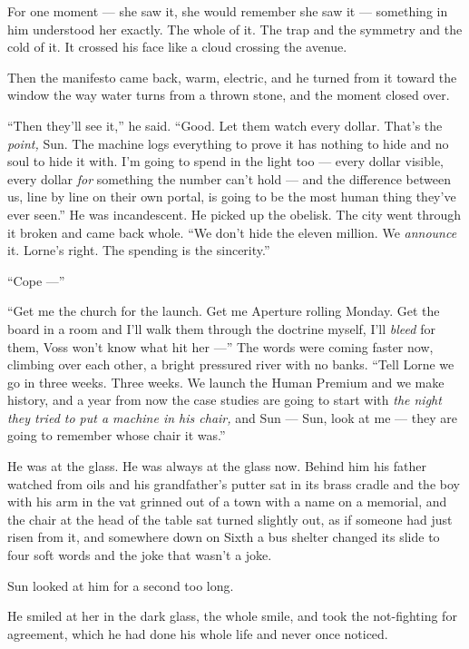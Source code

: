 \documentclass[11pt,openany]{book}
\begin{document}
For one moment --- she saw it, she would remember she saw it --- something in him understood her exactly. The whole of it. The trap and the symmetry and the cold of it. It crossed his face like a cloud crossing the avenue.

Then the manifesto came back, warm, electric, and he turned from it toward the window the way water turns from a thrown stone, and the moment closed over.

``Then they'll see it,'' he said. ``Good. Let them watch every dollar. That's the \textit{point,} Sun. The machine logs everything to prove it has nothing to hide and no soul to hide it with. I'm going to spend in the light too --- every dollar visible, every dollar \textit{for} something the number can't hold --- and the difference between us, line by line on their own portal, is going to be the most human thing they've ever seen.'' He was incandescent. He picked up the obelisk. The city went through it broken and came back whole. ``We don't hide the eleven million. We \textit{announce} it. Lorne's right. The spending is the sincerity.''

``Cope ---''

``Get me the church for the launch. Get me Aperture rolling Monday. Get the board in a room and I'll walk them through the doctrine myself, I'll \textit{bleed} for them, Voss won't know what hit her ---'' The words were coming faster now, climbing over each other, a bright pressured river with no banks. ``Tell Lorne we go in three weeks. Three weeks. We launch the Human Premium and we make history, and a year from now the case studies are going to start with \textit{the night they tried to put a machine in his chair,} and Sun --- Sun, look at me --- they are going to remember whose chair it was.''

He was at the glass. He was always at the glass now. Behind him his father watched from oils and his grandfather's putter sat in its brass cradle and the boy with his arm in the vat grinned out of a town with a name on a memorial, and the chair at the head of the table sat turned slightly out, as if someone had just risen from it, and somewhere down on Sixth a bus shelter changed its slide to four soft words and the joke that wasn't a joke.

Sun looked at him for a second too long.

He smiled at her in the dark glass, the whole smile, and took the not-fighting for agreement, which he had done his whole life and never once noticed.
\end{document}
